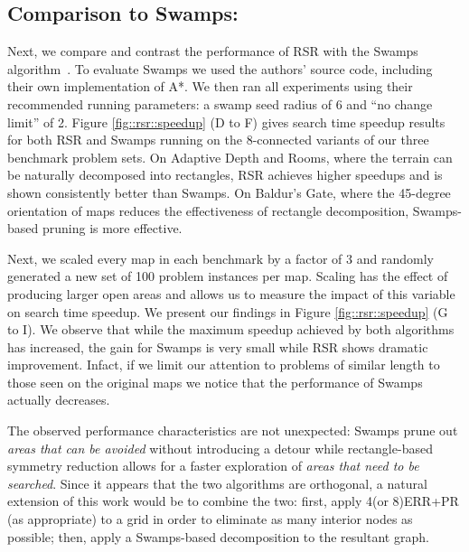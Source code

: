 \subsection{Comparison to Swamps:}
Next, we compare and contrast the performance of RSR with the Swamps
algorithm~\citep{pochter10}.  To evaluate Swamps we used the authors' source
code, including their own implementation of A*.  We then ran all experiments
using their recommended running parameters: a swamp seed radius of 6 and ``no
change limit'' of 2.
Figure \ref{fig::rsr::speedup} (D to F) gives search time speedup results for both RSR
and Swamps running on the 8-connected variants of our three benchmark problem
sets. 
On Adaptive Depth and Rooms, where the terrain can be naturally decomposed into
rectangles, RSR achieves higher speedups and is shown consistently better than Swamps. 
On Baldur's Gate, where the 45-degree orientation of maps reduces the effectiveness
of rectangle decomposition, Swamps-based pruning is more effective. 
\par
Next, we scaled every map in each benchmark by a factor of 3 and randomly
generated a new set of 100 problem instances per map.  Scaling has the effect of
producing larger open areas and allows us to measure the impact of this variable
on search time speedup.  We present our findings in  Figure \ref{fig::rsr::speedup} (G
to I).  We observe that while the maximum speedup achieved by both algorithms
has increased, the gain for Swamps is very small while RSR shows dramatic
improvement.  Infact, if we limit our attention to problems of similar length to
those seen on the original maps we notice that the performance of Swamps
actually decreases.
\par
The observed performance characteristics are not unexpected: Swamps prune out
\textit{areas that can be avoided} without introducing a detour while rectangle-based
symmetry reduction allows for a faster exploration of \textit{areas that need to be
searched}.  Since it appears that the two algorithms are orthogonal, a natural
extension of this work would be to combine the two: first, apply 4(or 8)ERR+PR
(as appropriate) to a grid in order to eliminate as many interior nodes as
possible; then, apply a Swamps-based decomposition to the resultant graph.



